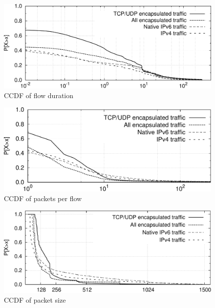 \begin{figure}[!tb]
     \centering
     \includegraphics[width=1.00\textwidth]{figures/paper-tunnels/cdf_functions/cdf_duration}
     \caption{CCDF of flow duration}
     \label{fig:ipv6-tunnels-cdf_duration}
\end{figure}

\begin{figure}[!tb]
     \centering
     \includegraphics[width=1.00\textwidth]{figures/paper-tunnels/cdf_functions/cdf_packets}
     \caption{CCDF of packets per flow}
     \label{fig:ipv6-tunnels-cdf_packets}
\end{figure}

\begin{figure}[!tb]
     \centering
     \includegraphics[width=1.00\textwidth]{figures/paper-tunnels/cdf_functions/cdf_bytes}
     \caption{CCDF of packet size}
     \label{fig:ipv6-tunnels-cdf_bytes}
\end{figure}

